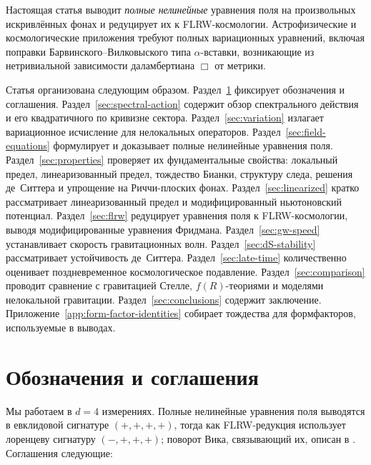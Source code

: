 \documentclass[12pt,a4paper]{article}
\theoremstyle{plain}
\theoremstyle{definition}
\begin{document}
Настоящая статья выводит \emph{полные нелинейные} уравнения поля на
произвольных искривлённых фонах и редуцирует их к FLRW-космологии.
Астрофизические и космологические приложения требуют полных вариационных
уравнений, включая поправки Барвинского--Вилковыского типа
$\alpha$-вставки, возникающие из нетривиальной зависимости
даламбертиана $\Box$ от метрики.

Статья организована следующим образом.
Раздел~\ref{sec:conventions} фиксирует обозначения и соглашения.
Раздел~\ref{sec:spectral-action} содержит обзор спектрального действия и
его квадратичного по кривизне сектора.
Раздел~\ref{sec:variation} излагает вариационное исчисление для нелокальных
операторов.
Раздел~\ref{sec:field-equations} формулирует и доказывает полные нелинейные
уравнения поля.
Раздел~\ref{sec:properties} проверяет их фундаментальные свойства:
локальный предел, линеаризованный предел, тождество Бианки, структуру
следа, решения де~Ситтера и упрощение на Риччи-плоских фонах.
Раздел~\ref{sec:linearized} кратко рассматривает линеаризованный предел и
модифицированный ньютоновский потенциал.
Раздел~\ref{sec:flrw} редуцирует уравнения поля к FLRW-космологии,
выводя модифицированные уравнения Фридмана.
Раздел~\ref{sec:gw-speed} устанавливает скорость гравитационных волн.
Раздел~\ref{sec:dS-stability} рассматривает устойчивость де~Ситтера.
Раздел~\ref{sec:late-time} количественно оценивает поздневременное
космологическое подавление.
Раздел~\ref{sec:comparison} проводит сравнение с гравитацией Стелле,
$f(R)$-теориями и моделями нелокальной гравитации.
Раздел~\ref{sec:conclusions} содержит заключение.
Приложение~\ref{app:form-factor-identities} собирает тождества для
формфакторов, используемые в выводах.

\section{Обозначения и соглашения}
\label{sec:conventions}

Мы работаем в $d = 4$ измерениях.  Полные нелинейные уравнения поля
выводятся в евклидовой сигнатуре $(+,+,+,+)$, тогда как
FLRW-редукция использует лоренцеву сигнатуру $(-,+,+,+)$; поворот Вика,
связывающий их, описан в \cite{Alfyorov:2026ff}.  Соглашения следующие:
\end{document}
